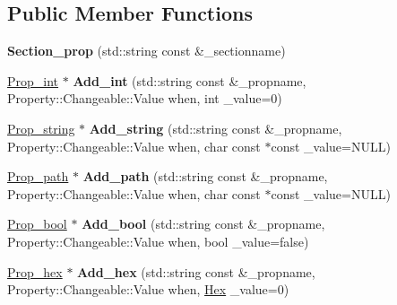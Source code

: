 \subsection*{Public Member Functions}
\begin{DoxyCompactItemize}
\item 
\hypertarget{classSection__prop_ac93eb81df5418886b5e8c9c19add8a7a}{{\bfseries Section\-\_\-prop} (std\-::string const \&\-\_\-sectionname)}\label{classSection__prop_ac93eb81df5418886b5e8c9c19add8a7a}

\item 
\hypertarget{classSection__prop_a094a4bcbb16e3b99bf1daf0ceef0c3ba}{\hyperlink{classProp__int}{Prop\-\_\-int} $\ast$ {\bfseries Add\-\_\-int} (std\-::string const \&\-\_\-propname, Property\-::\-Changeable\-::\-Value when, int \-\_\-value=0)}\label{classSection__prop_a094a4bcbb16e3b99bf1daf0ceef0c3ba}

\item 
\hypertarget{classSection__prop_a7d056104027208c73c2362ff2a654270}{\hyperlink{classProp__string}{Prop\-\_\-string} $\ast$ {\bfseries Add\-\_\-string} (std\-::string const \&\-\_\-propname, Property\-::\-Changeable\-::\-Value when, char const $\ast$const \-\_\-value=N\-U\-L\-L)}\label{classSection__prop_a7d056104027208c73c2362ff2a654270}

\item 
\hypertarget{classSection__prop_a0622d2d71f11206c9f19fca06ed36431}{\hyperlink{classProp__path}{Prop\-\_\-path} $\ast$ {\bfseries Add\-\_\-path} (std\-::string const \&\-\_\-propname, Property\-::\-Changeable\-::\-Value when, char const $\ast$const \-\_\-value=N\-U\-L\-L)}\label{classSection__prop_a0622d2d71f11206c9f19fca06ed36431}

\item 
\hypertarget{classSection__prop_a8390e8dd58a0e34f7680963ca815e774}{\hyperlink{classProp__bool}{Prop\-\_\-bool} $\ast$ {\bfseries Add\-\_\-bool} (std\-::string const \&\-\_\-propname, Property\-::\-Changeable\-::\-Value when, bool \-\_\-value=false)}\label{classSection__prop_a8390e8dd58a0e34f7680963ca815e774}

\item 
\hypertarget{classSection__prop_a2be9597abd3ca80cf113061e286857fa}{\hyperlink{classProp__hex}{Prop\-\_\-hex} $\ast$ {\bfseries Add\-\_\-hex} (std\-::string const \&\-\_\-propname, Property\-::\-Changeable\-::\-Value when, \hyperlink{classHex}{Hex} \-\_\-value=0)}\label{classSection__prop_a2be9597abd3ca80cf113061e286857fa}


\end{DoxyCompactItemize}
